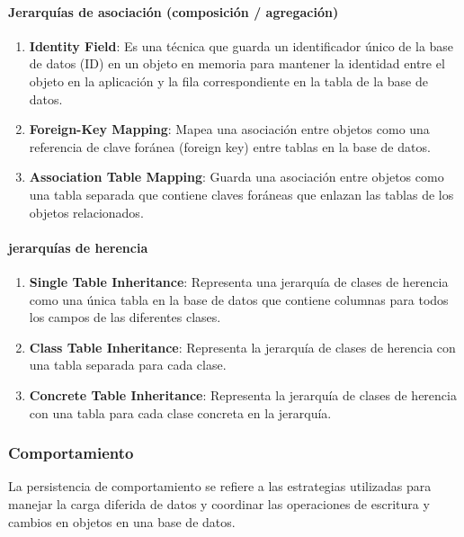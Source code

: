 \documentclass{article}
\begin{document}
		\paragraph{Jerarquías de asociación (composición / agregación)}
		
			\begin{enumerate}
			\item {\textbf{Identity Field}}: Es una técnica que guarda un identificador único de la base de datos (ID) en un objeto en memoria para mantener la identidad entre el objeto en la aplicación y la fila correspondiente en la tabla de la base de datos.
			
			
			\item {\textbf{Foreign-Key Mapping}}: Mapea una asociación entre objetos como una referencia de clave foránea (foreign key) entre tablas en la base de datos.
			
			\item {\textbf{Association Table Mapping}}: Guarda una asociación entre objetos como una tabla separada que contiene claves foráneas que enlazan las tablas de los objetos relacionados.
			
		\end{enumerate}

		\paragraph{jerarquías de herencia}
		
			\begin{enumerate}
				\item {\textbf{Single Table Inheritance}}: Representa una jerarquía de clases de herencia como una única tabla en la base de datos que contiene columnas para todos los campos de las diferentes clases.				
				
				\item {\textbf{Class Table Inheritance}}: Representa la jerarquía de clases de herencia con una tabla separada para cada clase.				
				
				
				\item {\textbf{Concrete Table Inheritance}}: Representa la jerarquía de clases de herencia con una tabla para cada clase concreta en la jerarquía.
				
			\end{enumerate}
		
		\subsubsection{Comportamiento}
		La persistencia de comportamiento se refiere a las estrategias utilizadas para manejar la carga diferida de datos y coordinar las operaciones de escritura y cambios en objetos en una base de datos.
		
\end{document}
